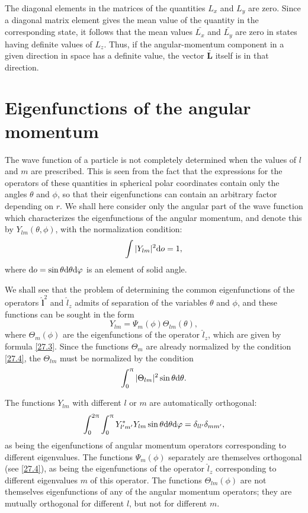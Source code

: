 The diagonal elements in the matrices of the quantities $ L_x $ and $ L_y $ are zero. Since a diagonal matrix element gives the mean value of the quantity in the corresponding state, it follows that the mean values $\bar{{L}_x}$ and $ \bar{{L}_y} $ are zero in states having definite values of $ L_z $. Thus, if the angular-momentum component in a given direction in space has a definite value, the vector $\bar{\bm{L}}$ itself is in that direction.





\section{Eigenfunctions of the angular momentum}\label{Eigenfunctions of the angular momentum}


The wave function of a particle is not completely determined when the values of $ l $ and $ m $ are prescribed. This is seen from the fact that the expressions for the operators of these quantities in spherical polar coordinates contain only the angles $\theta$ and $\phi$, so that their eigenfunctions can contain an arbitrary factor depending on $ r $. We shall here consider only the angular part of the wave function which characterizes the eigenfunctions of the angular momentum, and denote this by $ Y_{lm} (\theta,\phi) $, with the normalization condition:
\[ \int|Y_{lm}|^2\mathrm{d} o=1, \]
where $ \mathrm{d} o = \sin\theta\mathrm{d}\theta\mathrm{d}\varphi $ is an element of solid angle.

We shall see that the problem of determining the common eigenfunctions of the operators $\hat{\bm{l}}^2$ and $ \hat{l}_z $ admits of separation of the variables $\theta$ and $\phi$, and these functions can be sought in the form
\begin{equation}\label{28.1}
Y_{lm}=\Psi_m(\phi)\Theta_{lm}(\theta),
\end{equation}
where $ \Theta_m(\phi) $ are the eigenfunctions of the operator $\hat{l}_z$, which are given by formula \eqref{27.3}. Since the functions $\Theta_m$ are already normalized by the condition \eqref{27.4}, the $\Theta_{lm}$ must be normalized by the condition
\begin{equation}\label{28.2}
\int_{0}^{\uppi}|\Theta_{lm}|^2\sin\theta\mathrm{d}\theta.
\end{equation}


The functions $ Y_{lm} $ with different $ l $ or $ m $ are automatically orthogonal:
\begin{equation}\label{28.3}
\int_{0}^{2\uppi}\int_{0}^{\uppi}Y_{l'm'}^*Y_{lm}\sin\theta\mathrm{d}\theta\mathrm{d}\varphi=\delta_{ll'}\delta_{mm'},
\end{equation}
as being the eigenfunctions of angular momentum operators corresponding to different eigenvalues. The functions $\Psi_{m}(\phi)$ separately are themselves orthogonal (see \eqref{27.4}), as being the eigenfunctions of the operator $ \hat{l}_z $ corresponding to different eigenvalues $ m $ of this operator. The functions $\Theta_{lm}(\phi)$ are not themselves eigenfunctions of any of the angular momentum operators; they are mutually orthogonal for different $ l $, but not for different $ m $.

